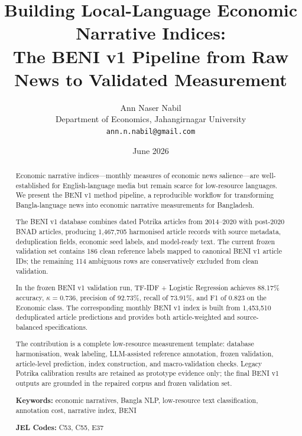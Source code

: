 \documentclass[11pt]{article}
\title{Building Local-Language Economic Narrative Indices: \\
The BENI v1 Pipeline from Raw News to Validated Measurement}
\author{Ann Naser Nabil \\
Department of Economics, Jahangirnagar University \\
\texttt{ann.n.nabil@gmail.com}}
\date{June 2026}
\begin{document}
\maketitle

\begin{abstract}
Economic narrative indices---monthly measures of economic news salience---are well-established for English-language media but remain scarce for low-resource languages. We present the BENI v1 method pipeline, a reproducible workflow for transforming Bangla-language news into economic narrative measurements for Bangladesh.

The BENI v1 database combines dated Potrika articles from 2014--2020 with post-2020 BNAD articles, producing 1,467,705 harmonised article records with source metadata, deduplication fields, economic seed labels, and model-ready text. The current frozen validation set contains 186 clean reference labels mapped to canonical BENI v1 article IDs; the remaining 114 ambiguous rows are conservatively excluded from clean validation.

In the frozen BENI v1 validation run, TF-IDF + Logistic Regression achieves 88.17\% accuracy, $\kappa = 0.736$, precision of 92.73\%, recall of 73.91\%, and F1 of 0.823 on the Economic class. The corresponding monthly BENI v1 index is built from 1,453,510 deduplicated article predictions and provides both article-weighted and source-balanced specifications.

The contribution is a complete low-resource measurement template: database harmonisation, weak labeling, LLM-assisted reference annotation, frozen validation, article-level prediction, index construction, and macro-validation checks. Legacy Potrika calibration results are retained as prototype evidence only; the final BENI v1 outputs are grounded in the repaired corpus and frozen validation set.

\textbf{Keywords:} economic narratives, Bangla NLP, low-resource text classification, annotation cost, narrative index, BENI

\textbf{JEL Codes:} C53, C55, E37
\end{abstract}












\end{document}
